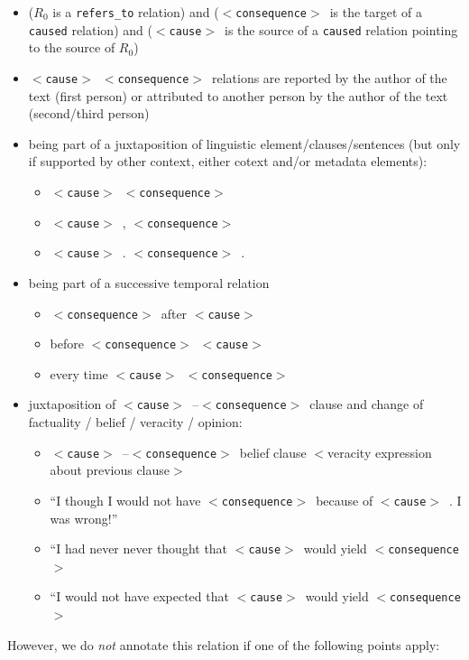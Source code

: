 \documentclass[12pt]{article}
\theoremstyle{definition}
\newcommand{\cause}{$<$\texttt{cause}$>$\ }
\newcommand{\conseq}{$<$\texttt{consequence}$>$\ }
\begin{document}
\begin{itemize}
\begin{itemize}
        \item \cause is probably linked with \conseq and \cause is preceding \conseq
    \end{itemize}
    \item ($R_0$ is a \texttt{refers\_to} relation) and (\conseq is the target of a \texttt{caused} relation) and (\cause is the source of a \texttt{caused} relation pointing  to the source of $R_0$)
    \item \cause \conseq relations are reported by the author of the text (first person) or attributed to another person by the author of the text (second/third person)
    \item being part of a juxtaposition of linguistic element/clauses/sentences (but only if supported by other context, either cotext and/or metadata elements):
    \begin{itemize}
        \item \cause \conseq
        \item \cause, \conseq
        \item \cause. \conseq.
    \end{itemize}
    \item being part of a successive temporal relation
    \begin{itemize}
        \item \conseq after \cause
        \item before \conseq \cause
        \item every time \cause \conseq
    \end{itemize}
    \item juxtaposition of \cause--\conseq clause and change of factuality / belief / veracity / opinion:
    \begin{itemize}
        \item \cause--\conseq belief clause  $<$veracity expression about previous clause$>$
        \item ``I though I would not have \conseq because of \cause. I was wrong!''
        \item ``I had never never thought that \cause would yield \conseq
        \item ``I would not have expected that \cause would yield \conseq
    \end{itemize}


 
\end{itemize}


However, we do \emph{not} annotate this relation if one of the following points apply:
\end{document}
